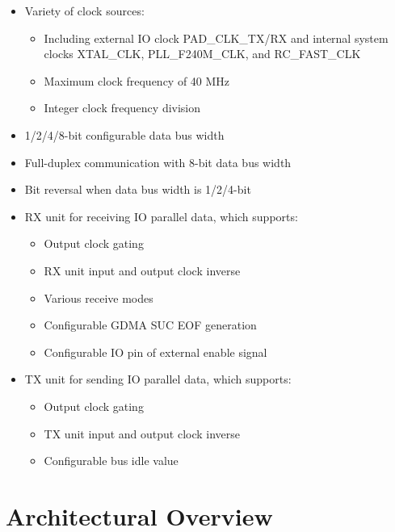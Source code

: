 \documentclass[main\_\_EN.tex]{subfiles}
\begin{document}
\begin{itemize}
    \item Variety of clock sources:
    \begin{itemize}
        \item Including external IO clock PAD\_CLK\_TX/RX and internal system clocks XTAL\_CLK, PLL\_F240M\_CLK, and RC\_FAST\_CLK
        \item Maximum clock frequency of 40 MHz
        \item Integer clock frequency division
    \end{itemize}
    \item 1/2/4/8-bit configurable data bus width
    \item Full-duplex communication with 8-bit data bus width
    \item Bit reversal when data bus width is 1/2/4-bit 
    \item RX unit for receiving IO parallel data, which supports:
    \begin{itemize}
        \item Output clock gating
        \item RX unit input and output clock inverse
        \item Various receive modes
        \item Configurable GDMA SUC EOF generation
        \item Configurable IO pin of external enable signal
    \end{itemize}
    \item TX unit for sending IO parallel data, which supports:
    \begin{itemize}
        \item Output clock gating
        \item TX unit input and output clock inverse
        \item Configurable bus idle value
    \end{itemize}

\end{itemize}



\section{Architectural Overview}
\label{sec:parlio-arch-overview}
\end{document}
